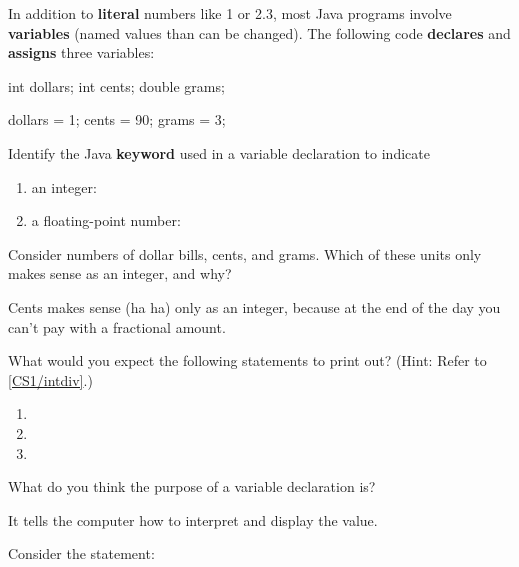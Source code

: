 
\label{CS1/variable-declare}

In addition to \textbf{literal} numbers like 1 or 2.3, most Java programs involve \textbf{variables} (named values than can be changed).
The following code \textbf{declares} and \textbf{assigns} three variables:

\begin{javabox}
int dollars;
int cents;
double grams;

dollars = 1;
cents = 90;
grams = 3;
\end{javabox}



\Q Identify the Java \textbf{keyword} used in a variable declaration to indicate

\begin{enumerate}
\item an integer: 
\item a floating-point number: 
\end{enumerate}


\Q Consider numbers of dollar bills, cents, and grams. Which of these units only makes sense as an integer, and why?

\begin{answer}
Cents makes sense (ha ha) only as an integer, because at the end of the day you can't pay with a fractional amount.
\end{answer}


\Q What would you expect the following statements to print out? (Hint: Refer to \ref{CS1/intdiv}.)

\begin{enumerate}
\item {} 
\item {} 
\item {} 
\end{enumerate}


\Q What do you think the purpose of a variable declaration is?

\begin{answer}
It tells the computer how to interpret and display the value.
\end{answer}


\Q Consider the statement: ~ 

